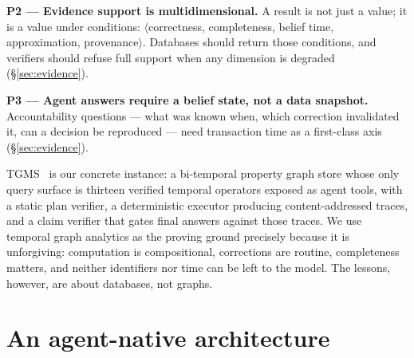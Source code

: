 \documentclass[sigconf]{acmart}
\begin{document}
\textbf{P2 --- Evidence support is multidimensional.} A result is not
just a value; it is a value under conditions:
$\langle$correctness, completeness, belief time, approximation,
provenance$\rangle$. Databases should return those conditions, and
verifiers should refuse full support when any dimension is degraded
(\S\ref{sec:evidence}).

\textbf{P3 --- Agent answers require a belief state, not a data
snapshot.} Accountability questions --- what was known when, which
correction invalidated it, can a decision be reproduced --- need
transaction time as a first-class axis (\S\ref{sec:evidence}).

TGMS~\cite{tgms2026} is our concrete instance: a bi-temporal property
graph store whose only query surface is thirteen verified temporal
operators exposed as agent tools, with a static plan verifier, a
deterministic executor producing content-addressed traces, and a claim
verifier that gates final answers against those traces. We use temporal
graph analytics as the proving ground precisely because it is
unforgiving: computation is compositional, corrections are routine,
completeness matters, and neither identifiers nor time can be left to
the model. The lessons, however, are about databases, not graphs.

\section{An agent-native architecture}
\label{sec:arch}
\end{document}
